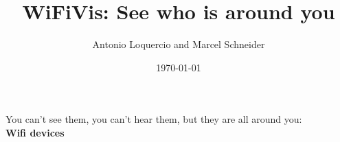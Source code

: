 \documentclass[aspectratio=169]{beamer}
\author{Antonio Loquercio and Marcel Schneider}
\title{WiFiVis: See who is around you}
\date{\today}
\begin{document}
\frame[plain]{\titlepage}
%
\begin{frame}
\begin{center}
\large You can't see them, you can't hear them, but they are all around you:\\
\textbf{Wifi devices}
\end{center}
\vspace{-5mm}
\begin{figure}
    \centering
    \def\svgwidth{\columnwidth}
    

\end{figure}
\end{frame}
\begin{frame}
   \centering
	\huge
    \def\svgwidth{\columnwidth}


\end{frame}
%
\end{document}
